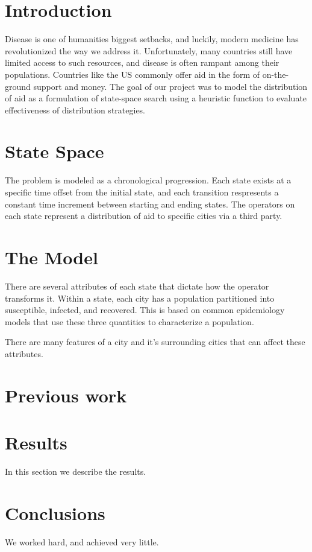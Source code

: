 \documentclass[12pt]{article}
\begin{document}
\maketitle

\section*{Introduction}
Disease is one of humanities biggest setbacks, and luckily, modern medicine
has revolutionized the way we address it. Unfortunately, many countries still
have limited access to such resources, and disease is often rampant among their
populations. Countries like the US commonly offer aid in the form of
on-the-ground support and money. The goal of our project was to model the
distribution of aid as a formulation of state-space search using a heuristic
function to evaluate effectiveness of distribution strategies. 

\section*{State Space}
The problem is modeled as a chronological progression. Each state exists at a
specific time offset from the initial state, and each transition respresents a
constant time increment between starting and ending states. The operators on
each state represent a distribution of aid to specific cities via a third party.


\section*{The Model}
There are several attributes of each state that dictate how the operator
transforms it. Within a state, each city has a population partitioned into
susceptible, infected, and recovered. This is based on common epidemiology
models that use these three quantities to characterize a population.

There are many features of a city and it's surrounding cities that can affect these
attributes.

\section*{Previous work}

\section*{Results}
In this section we describe the results.

\section*{Conclusions}
We worked hard, and achieved very little.
\end{document}
